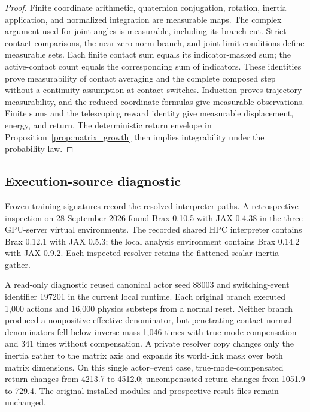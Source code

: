 \begin{proof}
Finite coordinate arithmetic, quaternion conjugation, rotation, inertia application, and normalized integration are measurable maps.
The complex argument used for joint angles is measurable, including its branch cut.
Strict contact comparisons, the near-zero norm branch, and joint-limit conditions define measurable sets.
Each finite contact sum equals its indicator-masked sum; the active-contact count equals the corresponding sum of indicators.
These identities prove measurability of contact averaging and the complete composed step without a continuity assumption at contact switches.
Induction proves trajectory measurability, and the reduced-coordinate formulas give measurable observations.
Finite sums and the telescoping reward identity give measurable displacement, energy, and return.
The deterministic return envelope in Proposition~\ref{prop:matrix_growth} then implies integrability under the probability law.
\end{proof}

\subsection{Execution-source diagnostic}
\label{app:source_diagnostic}

Frozen training signatures record the resolved interpreter paths.
A retrospective inspection on 28 September 2026 found Brax 0.10.5 with JAX 0.4.38 in the three GPU-server virtual environments.
The recorded shared HPC interpreter contains Brax 0.12.1 with JAX 0.5.3; the local analysis environment contains Brax 0.14.2 with JAX 0.9.2.
Each inspected resolver retains the flattened scalar-inertia gather.

A read-only diagnostic reused canonical actor seed 88003 and switching-event identifier 197201 in the current local runtime.
Each original branch executed 1,000 actions and 16,000 physics substeps from a normal reset.
Neither branch produced a nonpositive effective denominator, but penetrating-contact normal denominators fell below inverse mass 1,046 times with true-mode compensation and 341 times without compensation.
A private resolver copy changes only the inertia gather to the matrix axis and expands its world-link mask over both matrix dimensions.
On this single actor--event case, true-mode-compensated return changes from 4213.7 to 4512.0; uncompensated return changes from 1051.9 to 729.4.
The original installed modules and prospective-result files remain unchanged.


